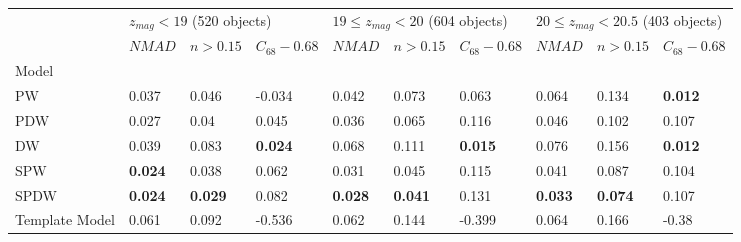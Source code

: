 \documentclass[fleqn,usenatbib]{mnras}
\begin{document}
\begin{table}
	\begin{tabular}{llllllllll}
            \hline
            {} & \multicolumn{3}{l}{$z_{mag} < 19$ (520 objects)} & \multicolumn{3}{l}{$19 \leq z_{mag} < 20$ (604 objects)} & \multicolumn{3}{l}{$20 \leq z_{mag} < 20.5$ (403 objects)} \\
            {} &                       $NMAD$ &        $n>0.15$ & $C_{68} - 0.68$ &                               $NMAD$ &        $n>0.15$ & $C_{68} - 0.68$ &                                 $NMAD$ &        $n>0.15$ & $C_{68} - 0.68$ \\
            Model          &                              &                 &                 &                                      &                 &                 &                                        &                 &                 \\
            \hline
            PW             &                        0.037 &           0.046 &          -0.034 &                                0.042 &           0.073 &           0.063 &                                  0.064 &           0.134 &  \textbf{0.012} \\
            PDW            &                        0.027 &            0.04 &           0.045 &                                0.036 &           0.065 &           0.116 &                                  0.046 &           0.102 &           0.107 \\
            DW             &                        0.039 &           0.083 &  \textbf{0.024} &                                0.068 &           0.111 &  \textbf{0.015} &                                  0.076 &           0.156 &  \textbf{0.012} \\
            SPW            &               \textbf{0.024} &           0.038 &           0.062 &                                0.031 &           0.045 &           0.115 &                                  0.041 &           0.087 &           0.104 \\
            SPDW           &               \textbf{0.024} &  \textbf{0.029} &           0.082 &                       \textbf{0.028} &  \textbf{0.041} &           0.131 &                         \textbf{0.033} &  \textbf{0.074} &           0.107 \\
            Template Model &                        0.061 &           0.092 &          -0.536 &                                0.062 &           0.144 &          -0.399 &                                  0.064 &           0.166 &           -0.38 \\

\end{tabular}
\end{table}
\end{document}
